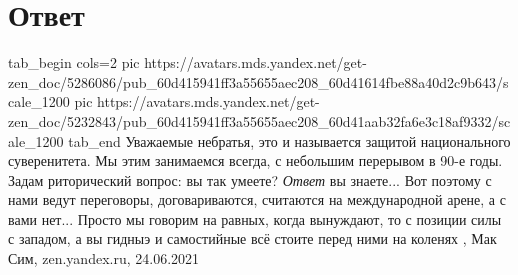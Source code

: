  
 
 
 
 
\chapter{Ответ}

\ifcmt
tab_begin cols=2
	pic https://avatars.mds.yandex.net/get-zen_doc/5286086/pub_60d415941ff3a55655aec208_60d41614fbe88a40d2c9b643/scale_1200
  pic https://avatars.mds.yandex.net/get-zen_doc/5232843/pub_60d415941ff3a55655aec208_60d41aab32fa6e3c18af9332/scale_1200
tab_end
\fi
Уважаемые небратья, это и называется защитой национального суверенитета. Мы
этим занимаемся всегда, с небольшим перерывом в 90-е годы. Задам риторический
вопрос: вы так умеете? \emph{Ответ} вы знаете...  Вот поэтому с нами ведут переговоры,
договариваются, считаются на международной арене, а с вами нет... Просто мы
говорим на равных, когда вынуждают, то с позиции силы с западом, а вы гидныэ и
самостийные всё стоите перед ними на коленях
, 
Мак Сим, zen.yandex.ru, 24.06.2021
